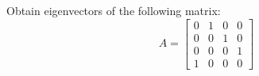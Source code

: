 \item Obtain eigenvectors of the following matrix:
\begin{equation*}
 A = \begin{bmatrix}
0 & 1 & 0 & 0\\
0 & 0 & 1 & 0\\
0 & 0 & 0 & 1\\
1 & 0 & 0 & 0
     \end{bmatrix}
\end{equation*}
